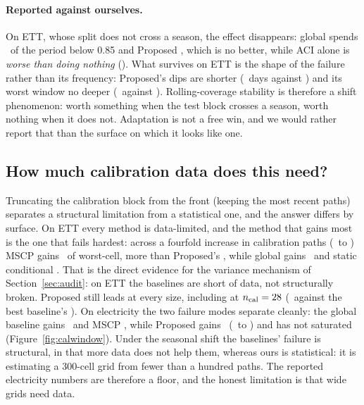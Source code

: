 \documentclass[11pt]{article}
\begin{document}
\paragraph{Reported against ourselves.} On ETT, whose split does not cross a season, the effect disappears: global spends \trettGlobalBelow\ of the period below 0.85 and Proposed \trettPropBelow, which is no better, while ACI alone is \emph{worse than doing nothing} (\trettACIBelow). What survives on ETT is the shape of the failure rather than its frequency: Proposed's dips are shorter (\trettPropExcursion\ days against \trettGlobalExcursion) and its worst window no deeper (\trettPropMinRoll\ against \trettGlobalMinRoll). Rolling-coverage stability is therefore a shift phenomenon: worth something when the test block crosses a season, worth nothing when it does not. Adaptation is not a free win, and we would rather report that than the surface on which it looks like one.

\subsection{How much calibration data does this need?}\label{sec:calwindow}

Truncating the calibration block from the front (keeping the most recent paths) separates a structural limitation from a statistical one, and the answer differs by surface. On ETT every method is data-limited, and the method that gains most is the one that fails hardest: across a fourfold increase in calibration paths (\cwettNcalQtr\ to \cwettNcalFull) MSCP gains \cwettMSCPGain\ of worst-cell, more than Proposed's \cwettPropGain, while global gains \cwettGlobalGain\ and static conditional \cwettCondGain. That is the direct evidence for the variance mechanism of Section~\ref{sec:audit}: on ETT the baselines are short of data, not structurally broken. Proposed still leads at every size, including at $n_{\mathrm{cal}} = 28$ (\cwettPropQtr\ against the best baseline's \cwettBestBaselineQtr). On electricity the two failure modes separate cleanly: the global baseline gains \cweclGlobalGain\ and MSCP \cweclMSCPGain, while Proposed gains \cweclPropGain\ (\cweclPropQtr\ to \cweclPropFull) and has not saturated (Figure~\ref{fig:calwindow}). Under the seasonal shift the baselines' failure is structural, in that more data does not help them, whereas ours is statistical: it is estimating a 300-cell grid from fewer than a hundred paths. The reported electricity numbers are therefore a floor, and the honest limitation is that wide grids need data.
\end{document}
